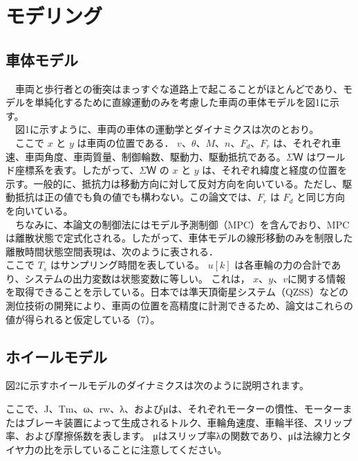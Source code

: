 \section{モデリング}
\subsection{車体モデル}
　車両と歩行者との衝突はまっすぐな道路上で起こることがほとんどであり、モデルを単純化するために直線運動のみを考慮した車両の車体モデルを図1に示す。\\
　図1に示すように、車両の車体の運動学とダイナミクスは次のとおり。\\


　ここで $x$ と $y$ は車両の位置である． $v$、$\theta$、$M$、$n$、$F_d$、$F_r$ は、それぞれ車速、車両角度、車両質量、制御輪数、駆動力、駆動抵抗である。$\Sigma Ｗ$ はワールド座標系を表す。したがって、$\Sigma Ｗ$ の $x$ と $y$ は、それぞれ緯度と経度の位置を示す。一般的に、抵抗力は移動方向に対して反対方向を向いている。ただし、駆動抵抗は正の値でも負の値でも構わない。この論文では、$F_r$ は $F_d$ と同じ方向を向いている。\\
　ちなみに、本論文の制御法にはモデル予測制御（MPC）を含んでおり、MPCは離散状態で定式化される。したがって、車体モデルの線形移動のみを制限した離散時間状態空間表現は、次のように表される．\\



ここで $T_s$ はサンプリング時間を表している。 $u[k]$ は各車輪の力の合計であり、システムの出力変数は状態変数に等しい。 これは， $x$、$y$、$v$に関する情報を取得できることを示している。日本では準天頂衛星システム（QZSS）などの測位技術の開発により、車両の位置を高精度に計測できるため、論文はこれらの値が得られると仮定している（7）。

\subsection{ホイールモデル}
図2に示すホイールモデルのダイナミクスは次のように説明されます。

ここで、J、Tm、ω、rw、λ、およびμは、それぞれモーターの慣性、モーターまたはブレーキ装置によって生成されるトルク、車輪角速度、車輪半径、スリップ率、および摩擦係数を表します。 μはスリップ率λの関数であり、μは法線力とタイヤ力の比を示していることに注意してください。

